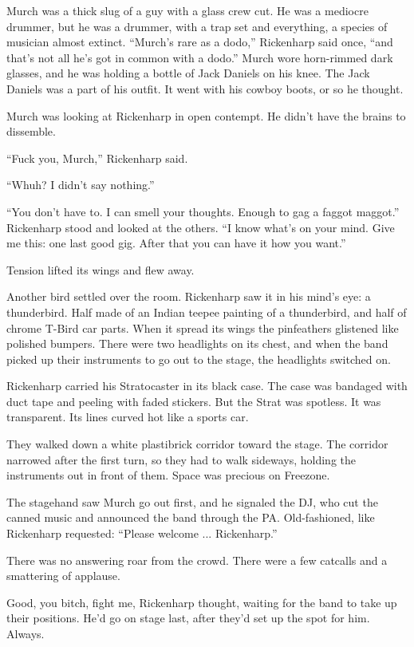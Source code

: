 Murch was a thick slug of a guy with a glass crew cut. He was a mediocre drummer, but he was a drummer, with a trap set and everything, a species of musician almost extinct. ``Murch's rare as a dodo,'' Rickenharp said once, ``and that's not all he's got in common with a dodo.'' Murch wore horn-rimmed dark glasses, and he was holding a bottle of Jack Daniels on his knee. The Jack Daniels was a part of his outfit. It went with his cowboy boots, or so he thought.

Murch was looking at Rickenharp in open contempt. He didn't have the brains to dissemble.

``Fuck you, Murch,'' Rickenharp said.

``Whuh? I didn't say nothing.''

``You don't have to. I can smell your thoughts. Enough to gag a faggot maggot.'' Rickenharp stood and looked at the others. ``I know what's on your mind. Give me this: one last good gig. After that you can have it how you want.''

Tension lifted its wings and flew away.

Another bird settled over the room. Rickenharp saw it in his mind's eye: a thunderbird. Half made of an Indian teepee painting of a thunderbird, and half of chrome T-Bird car parts. When it spread its wings the pinfeathers glistened like polished bumpers. There were two headlights on its chest, and when the band picked up their instruments to go out to the stage, the headlights switched on.

Rickenharp carried his Stratocaster in its black case. The case was bandaged with duct tape and peeling with faded stickers. But the Strat was spotless. It was transparent. Its lines curved hot like a sports car.

They walked down a white plastibrick corridor toward the stage. The corridor narrowed after the first turn, so they had to walk sideways, holding the instruments out in front of them. Space was precious on Freezone.

The stagehand saw Murch go out first, and he signaled the DJ, who cut the canned music and announced the band through the PA. Old-fashioned, like Rickenharp requested: ``Please welcome ... Rickenharp.''

There was no answering roar from the crowd. There were a few catcalls and a smattering of applause.

Good, you bitch, fight me, Rickenharp thought, waiting for the band to take up their positions. He'd go on stage last, after they'd set up the spot for him. Always.

